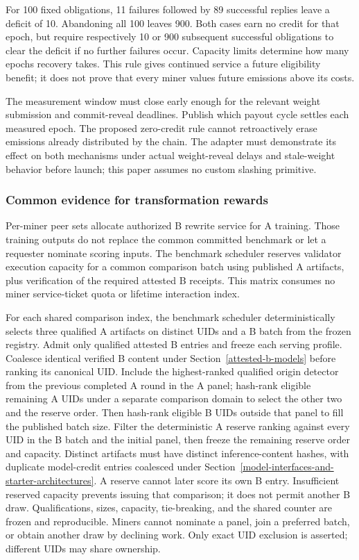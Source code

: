 For 100 fixed obligations, 11 failures followed by 89 successful replies
leave a deficit of 10. Abandoning all 100 leaves 900. Both cases earn no
credit for that epoch, but require respectively 10 or 900 subsequent
successful obligations to clear the deficit if no further failures occur.
Capacity limits determine how many epochs recovery takes. This rule gives
continued service a future eligibility benefit; it does not prove that
every miner values future emissions above its costs.

The measurement window must close early enough for the relevant weight
submission and commit-reveal deadlines. Publish which payout cycle
settles each measured epoch. The proposed zero-credit rule cannot
retroactively erase emissions already distributed by the chain. The
adapter must demonstrate its effect on both mechanisms under actual
weight-reveal delays and stale-weight behavior before launch; this
paper assumes no custom slashing primitive.

\subsubsection{Common evidence for transformation rewards}\label{common-transformation-evidence}

Per-miner peer sets allocate authorized B rewrite service for A training.
Those training outputs do not replace the common committed benchmark
or let a requester nominate scoring inputs. The benchmark scheduler reserves validator
execution capacity for a common comparison batch using published A
artifacts, plus verification of the required attested B receipts. This matrix consumes no miner service-ticket quota or lifetime
interaction index.

For each shared comparison index, the benchmark scheduler deterministically
selects three qualified A artifacts on distinct UIDs and a B batch from the
frozen registry.
Admit only qualified attested B entries and freeze each serving profile.
Coalesce identical verified B content under Section~\ref{attested-b-models}
before ranking its canonical UID. Include the
highest-ranked qualified origin detector from the previous completed A round
in the A panel; hash-rank eligible remaining A UIDs under a separate
comparison domain to select the other two and the reserve order. Then
hash-rank eligible B UIDs outside that panel to fill the published batch
size. Filter the deterministic A reserve ranking against every UID in
the B batch and the initial panel, then freeze the remaining reserve
order and capacity. Distinct artifacts must have distinct inference-content
hashes, with duplicate model-credit entries coalesced under
Section~\ref{model-interfaces-and-starter-architectures}. A reserve cannot later score its own B entry.
Insufficient reserved capacity prevents issuing that comparison; it
does not permit another B draw. Qualifications, sizes, capacity, tie-breaking, and the shared
counter are frozen and reproducible. Miners cannot nominate a panel,
join a preferred batch, or obtain another draw by declining work. Only
exact UID exclusion is asserted; different UIDs may share ownership.

